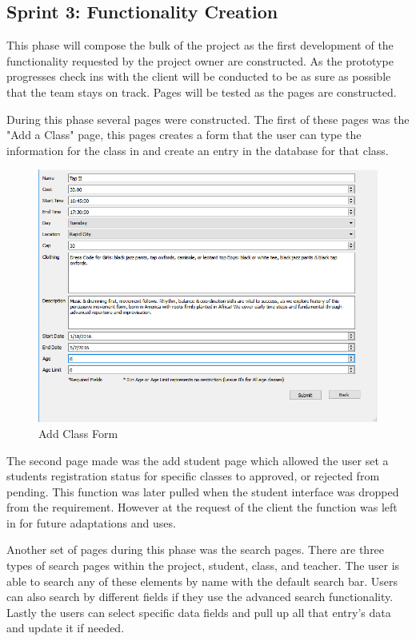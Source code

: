 \subsection{Sprint 3: Functionality Creation }
This phase will compose the bulk of the project as the first development of the functionality requested by the project owner are constructed. As the prototype progresses check ins with the client will be conducted to be as sure as possible that the team stays on track. Pages will be tested as the pages are constructed.

During this phase several pages were constructed. The first of these pages was the "Add a Class" page, this pages creates a form that the user can type the information for the class in and create an entry in the database for that class. 

\begin{figure}
  \includegraphics[width=\linewidth]{pics/Add_Class.png}
  \caption{Add Class Form}
  \label{fig:Add Class}
\end{figure}

The second page made was the add student page which allowed the user set a students registration status for specific classes to approved, or rejected from pending. This function was later pulled when the student interface was dropped from the requirement. However at the request of the client the function was left in for future adaptations and uses.

Another set of pages during this phase was the search pages. There are three types of search pages within the project, student, class, and teacher. The user is able to search any of these elements by name with the default search bar. Users can also search by different fields if they use the advanced search functionality. Lastly the users can select specific data fields and pull up all that entry's data and update it if needed.

